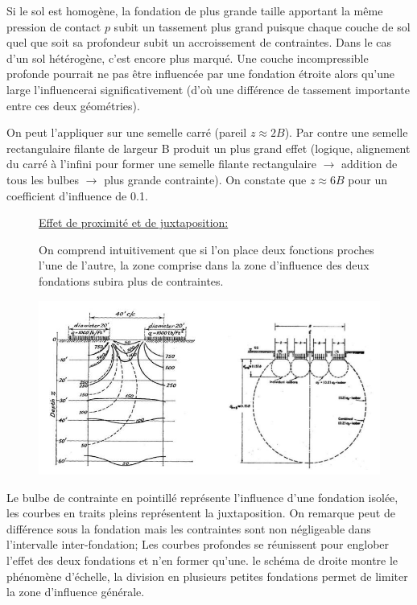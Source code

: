             Si le sol est homogène, la fondation de plus grande taille apportant la même pression de contact $p$ subit un tassement plus grand puisque chaque couche de sol quel que soit sa profondeur subit un accroissement de contraintes. Dans le cas d'un sol hétérogène, c'est encore plus marqué. Une couche incompressible profonde pourrait ne pas être influencée par une fondation étroite alors qu'une large l'influencerai significativement (d'où une différence de tassement importante entre ces deux géométries).
            
            On peut l'appliquer sur une semelle carré (pareil $z \approx 2B$). Par contre une semelle rectangulaire filante de largeur B produit un plus grand effet (logique, alignement du carré à l'infini pour former une semelle filante rectangulaire $\to$ addition de tous les bulbes $\to$ plus grande contrainte). On constate que $z \approx 6B$ pour un coefficient d'influence de 0.1. 
            
            \begin{figure}[h!]
            
            \underline{Effet de proximité et de juxtaposition: } 
            
            On comprend intuitivement que si l'on place deux fonctions proches l'une de l'autre, la zone comprise dans la zone d'influence des deux fondations subira plus de contraintes. 
            
                \centering
                \includegraphics[scale=0.8]{Holeyman/images/H31.PNG}
            \end{figure}
            
            Le bulbe de contrainte en pointillé représente l'influence d'une fondation isolée, les courbes en traits pleins représentent la juxtaposition. On remarque peut de différence sous la fondation mais les contraintes sont non négligeable dans l'intervalle inter-fondation; Les courbes profondes se réunissent pour englober l'effet des deux fondations et n'en former qu'une. le schéma de droite montre le phénomène d'échelle, la division en plusieurs petites fondations permet de limiter la zone d'influence générale. 
            
